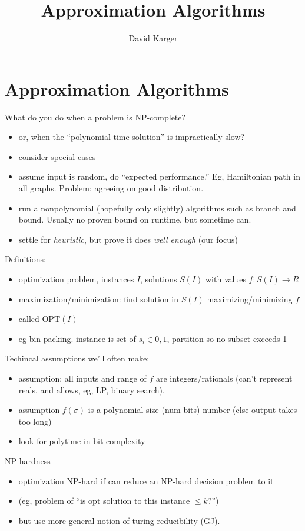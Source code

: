 \documentclass{article}
\title{Approximation Algorithms}
\author{David Karger}
\begin{document}
\section*{Approximation Algorithms}
What do you do when a problem is NP-complete?
\begin{itemize}
\item or, when the ``polynomial time solution'' is impractically slow?
\item consider special cases
\item assume input is random, do ``expected performance.''  Eg,
  Hamiltonian path in all graphs.  Problem: agreeing on good
  distribution.  
\item run a nonpolynomial (hopefully only slightly) algorithms such as
  branch and bound.  Usually no proven bound on runtime, but sometime can.
\item settle for \emph{heuristic}, but prove it does \emph{well enough}
  (our focus) 
\end{itemize}

Definitions:
\begin{itemize}
\item optimization problem, instances $I$, solutions $S(I)$ with
  values $f:S(I) \rightarrow R$
\item maximization/minimization: find solution in $S(I)$
  maximizing/minimizing $f$ 
\item called OPT$(I)$
\item eg bin-packing.  instance is set of $s_i \in {0,1}$, partition
  so no subset exceeds 1
\end{itemize}

Techincal assumptions we'll often make:
\begin{itemize}
\item assumption: all inputs and range of $f$ are integers/rationals
  (can't represent reals, and allows, eg, LP, binary search).  
\item assumption $f(\sigma)$ is a polynomial size (num bits) number
  (else output takes too long)
\item look for polytime in bit complexity
\end{itemize}

NP-hardness
\begin{itemize}
\item optimization NP-hard if can reduce  an NP-hard decision problem to it
\item (eg, problem of ``is opt solution to this instance $\le k$?'')
\item but use more general notion of turing-reducibility (GJ).
\end{itemize}
\end{document}
